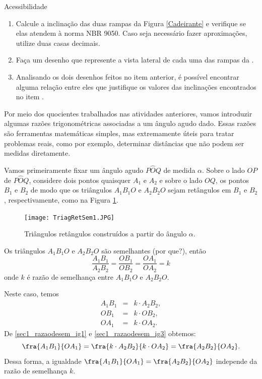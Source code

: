 \begin{task}{Acessibilidade}
\begin{enumerate}
\item{}
Calcule a inclinação das duas rampas da Figura \ref{Cadeirante} e verifique se elas atendem à norma NBR 9050. Caso seja necessário fazer aproximações, utilize duas casas decimais.

\item{}
Faça um desenho que represente a vista lateral de cada uma das rampas da . 

\item{}  
Analisando os dois desenhos feitos no item anterior, é possível encontrar alguma relação entre eles que justifique os valores das inclinações encontrados no item .
\end{enumerate}

\end{task}


Por meio dos quocientes trabalhados nas atividades anteriores, vamos introduzir algumas razões trigonométricas associadas a um ângulo agudo dado. Essas razões são ferramentas matemáticas simples, mas extremamente úteis para tratar problemas reais, como por exemplo, determinar distâncias que não podem ser medidas diretamente. 

Vamos primeiramente fixar um ângulo agudo $P\hat{O}Q$ de medida $\alpha$. Sobre o lado $OP$ de $P\hat{O}Q$, considere dois pontos quaisquer $A_1$ e $A_2$ e sobre o lado $OQ$, os pontos $B_1$ e $B_2$ de modo que os triângulos $A_1B_1O$ e $A_2B_2O$ sejam retângulos em $B_1$ e $B_2$, respectivamente, como na Figura \ref{TriagRet1}.

\begin{figure}[H]
    \centering
    \texttt{[image: TriagRetSem1.JPG]}
    \caption{Triângulos retângulos construídos a partir do ângulo $\alpha$.}
    \label{TriagRet1}
\end{figure}

Os triângulos $A_1B_1O$ e  $A_2B_2O$ são semelhantes (por que?), então
\begin{equation}
\frac{A_1B_1}{A_2B_2}=\frac{OB_1}{OB_2}=\frac{OA_1}{OA_2}=k \label{sec1_razaodesem}
\end{equation}
onde $k$ é razão de semelhança entre $A_1B_1O$ e $A_2B_2O$.

Neste caso, temos
\begin{eqnarray}
A_1B_1 & = & k \cdot A_2B_2, \label{sec1_razaodesem_ig1}\\ 
OB_1 & = & k \cdot OB_2,         \label{sec1_razaodesem_ig2} \\
OA_1 & = & k \cdot O A_2.         \label{sec1_razaodesem_ig3}
\end{eqnarray}
De \eqref{sec1_razaodesem_ig1} e \eqref{sec1_razaodesem_ig3} obtemos:
\begin{equation}
\fra{A_1B_1}{OA_1}=\fra{k\cdot A_2B_2}{k \cdot OA_2}=\fra{A_2B_2}{OA_2}. \label{sec1_razaodesem_ig4}
\end{equation}
Dessa forma, a igualdade $\fra{A_1B_1}{OA_1}=\fra{A_2B_2}{OA_2}$ independe da razão de semelhança $k$. 

